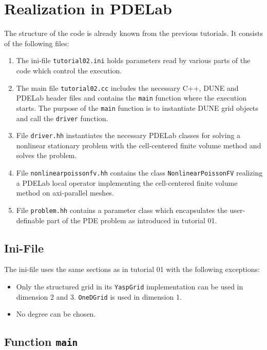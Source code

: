 \documentclass[a4paper,12pt]{article}
\begin{document}
\section{Realization in PDELab}

The structure of the code is already known from the previous tutorials.
It consists of the following files:
\begin{enumerate}[1)]
\item The ini-file
\lstinline{tutorial02.ini} holds parameters read by various parts of the code
which control the execution.
\item The main file \lstinline{tutorial02.cc} includes the necessary C++,
DUNE and PDELab header files
and contains the \lstinline{main} function where the execution starts.
The purpose of the \lstinline{main} function is
to instantiate DUNE grid objects and call the \lstinline{driver} function.
\item File \lstinline{driver.hh} instantiates the necessary PDELab classes
for solving a nonlinear stationary problem with the cell-centered finite
volume method and solves the problem.
\item File \lstinline{nonlinearpoissonfv.hh} contains the class
\lstinline{NonlinearPoissonFV} realizing a PDELab local operator implementing
the cell-centered finite volume method on axi-parallel meshes.
\item File \lstinline{problem.hh} contains a parameter class which
encapsulates the user-definable part of the PDE problem as introduced in
tutorial 01.
\end{enumerate}

\subsection{Ini-File}

The ini-file uses the same sections as in tutorial 01 with the following exceptions:
\begin{itemize}
\item Only the structured grid in its \lstinline{YaspGrid} implementation can be used
in dimension 2 and 3. \lstinline{OneDGrid} is used in dimension 1.
\item No degree can be chosen.
\end{itemize}

\subsection{Function \lstinline{main}}
\end{document}
